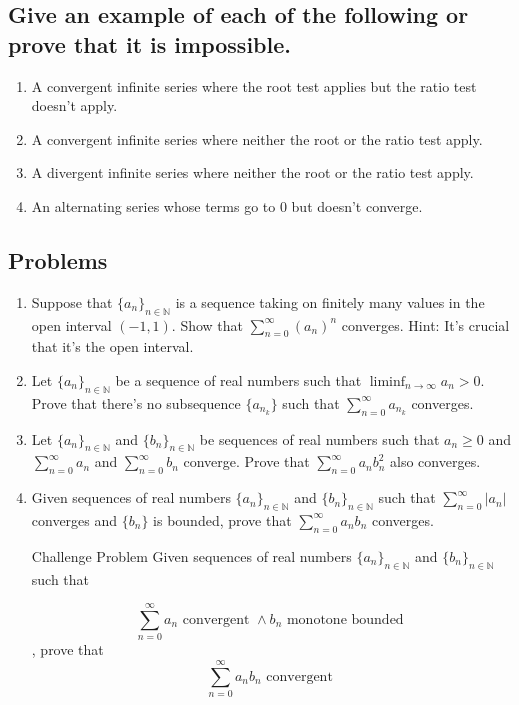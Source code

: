 \documentclass{article}
\theoremstyle{definition}
\begin{document}
\subsection{Give an example of each of the following or prove that it is impossible.}

\begin{enumerate}
    \item A convergent infinite series where the root test applies but the ratio test doesn't apply.
    \item A convergent infinite series where neither the root or the ratio test apply.
    \item A divergent infinite series where neither the root or the ratio test apply.
    \item An alternating series whose terms go to $0$ but doesn't converge.
    
\end{enumerate}

\subsection{Problems}

\begin{enumerate}
    \item Suppose that $\{a_{n}\}_{n \in \mathbb{N}}$ is a sequence taking on finitely many values in the open interval $(-1,1)$. Show that $ \sum\limits_{n = 0}^\infty (a_{n})^{n}$ converges. Hint: It's crucial that it's the open interval.
    \item Let $\{a_{n}\}_{n \in \mathbb{N}}$ be a sequence of real numbers such that $\liminf_{n \to \infty} a_{n} > 0$. Prove that there's no subsequence $\{ a_{n_{k}}\}$ such that $ \sum\limits_{n = 0}^\infty a_{n_{k}}$ converges.
    \item Let $\{a_{n}\}_{n \in \mathbb{N}}$ and $\{b_{n}\}_{n \in \mathbb{N}}$ be sequences of real numbers such that $a_{n} \geq 0$ and $\sum\limits_{n = 0}^\infty a_{n}$ and $\sum\limits_{n = 0}^\infty b_{n}$ converge. Prove that $\sum\limits_{n = 0}^\infty a_{n}b_{n}^{2}$ also converges.

    \item Given sequences of real numbers $\{a_{n}\}_{n \in \mathbb{N}}$ and $\{b_{n}\}_{n \in \mathbb{N}}$ such that $\sum\limits_{n = 0}^\infty \lvert a_{n} \rvert $ converges and $\{ b_{n} \}$ is bounded, prove that $\sum\limits_{n = 0}^\infty a_{n} b_{n}$ converges. 
    \item[Challenge Problem] Given sequences of real numbers $\{a_{n}\}_{n \in \mathbb{N}}$ and $\{b_{n}\}_{n \in \mathbb{N}}$ such that 

    \[ \sum\limits_{n = 0}^\infty a_{n} \text{ convergent } \land b_{n} \text{ monotone bounded }\], prove that \[\sum\limits_{n = 0}^\infty a_{n}b_{n} \text{ convergent }\]

\end{enumerate}
\end{document}
